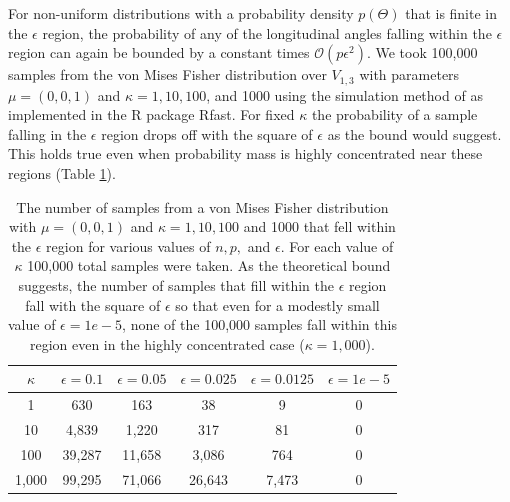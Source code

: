 \documentclass[ba]{imsart}
\numberwithin{equation}{section}
\theoremstyle{plain}
\begin{document}
\noindent For non-uniform distributions with a probability density $p(\Theta)$ that is finite in the $\epsilon$ region, the probability of any of the longitudinal angles falling within the $\epsilon$ region can again be bounded by a constant times $\mathcal{O}(p \epsilon^2)$. We took 100,000 samples from the von Mises Fisher distribution over $V_{1,3}$ with parameters $\mu = (0,0,1)$ and $\kappa = 1, 10, 100$, and 1000 using the simulation method of \citet{wood1994simulation} as implemented in the R package Rfast. For fixed $\kappa$ the probability of a sample falling in the $\epsilon$ region drops off with the square of $\epsilon$ as the bound would suggest. This holds true even when probability mass is highly concentrated near these regions (Table \ref{tab:vmf_epsilon_region}).  

\begin{table}
\begin{tabular}{|c||ccccc|}
\hline
$\kappa$  & $\epsilon = 0.1$ & $\epsilon = 0.05$ & $\epsilon = 0.025$ & $\epsilon = 0.0125$ & $\epsilon = 1e-5$\\
\hline
\hline
1 & 630 & 163 & 38 & 9 & 0\\
10 & 4,839 & 1,220 & 317 & 81 & 0\\
100 & 39,287 & 11,658 & 3,086 & 764 & 0 \\
1,000  & 99,295 & 71,066 & 26,643 & 7,473 & 0 \\
\hline
\end{tabular}
\caption{The number of samples from a von Mises Fisher distribution with $\mu = (0,0,1)$ and $\kappa = 1, 10, 100$ and 1000 that fell within the $\epsilon$ region for various values of $n, p,$ and $\epsilon$. For each value of $\kappa$ 100,000 total samples were taken. As the theoretical bound suggests, the number of samples that fill within the $\epsilon$ region fall with the square of $\epsilon$ so that even for a modestly small value of $\epsilon = 1e-5$, none of the 100,000 samples fall within this region even in the highly concentrated case ($\kappa = 1,000$).}
\label{tab:vmf_epsilon_region}
\end{table}
\end{document}
